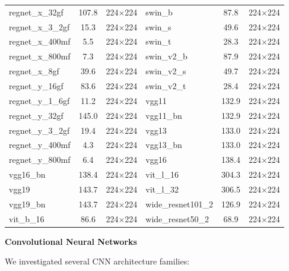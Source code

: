\documentclass[12pt,a4paper,oneside]{report}
\begin{document}
\begin{table}[htbp]
{\begin{tabular}{lcc|lcc}
regnet\_x\_32gf & 107.8 & 224$\times$224 & swin\_b & 87.8 & 224$\times$224 \\
regnet\_x\_3\_2gf & 15.3 & 224$\times$224 & swin\_s & 49.6 & 224$\times$224 \\
regnet\_x\_400mf & 5.5 & 224$\times$224 & swin\_t & 28.3 & 224$\times$224 \\
regnet\_x\_800mf & 7.3 & 224$\times$224 & swin\_v2\_b & 87.9 & 224$\times$224 \\
regnet\_x\_8gf & 39.6 & 224$\times$224 & swin\_v2\_s & 49.7 & 224$\times$224 \\
regnet\_y\_16gf & 83.6 & 224$\times$224 & swin\_v2\_t & 28.4 & 224$\times$224 \\
regnet\_y\_1\_6gf & 11.2 & 224$\times$224 & vgg11 & 132.9 & 224$\times$224 \\
regnet\_y\_32gf & 145.0 & 224$\times$224 & vgg11\_bn & 132.9 & 224$\times$224 \\
regnet\_y\_3\_2gf & 19.4 & 224$\times$224 & vgg13 & 133.0 & 224$\times$224 \\
regnet\_y\_400mf & 4.3 & 224$\times$224 & vgg13\_bn & 133.0 & 224$\times$224 \\
regnet\_y\_800mf & 6.4 & 224$\times$224 & vgg16 & 138.4 & 224$\times$224 \\
vgg16\_bn & 138.4 & 224$\times$224 & vit\_l\_16 & 304.3 & 224$\times$224 \\
vgg19 & 143.7 & 224$\times$224 & vit\_l\_32 & 306.5 & 224$\times$224 \\
vgg19\_bn & 143.7 & 224$\times$224 & wide\_resnet101\_2 & 126.9 & 224$\times$224 \\
vit\_b\_16 & 86.6 & 224$\times$224 & wide\_resnet50\_2 & 68.9 & 224$\times$224 \\
\bottomrule
\end{tabular}%
}
\end{table}

\textbf{Convolutional Neural Networks}

We investigated several CNN architecture families:
\end{document}
